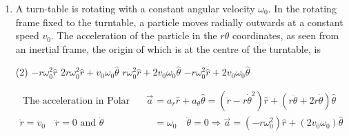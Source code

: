 \begin{enumerate}
 \begin{tasks}(4)
	\task[\textbf{a.}]$10 g$
	\task[\textbf{b.}] $50 \mathrm{~g}$
	\task[\textbf{c.}] $100 \mathrm{~g}$
	\task[\textbf{d.}]  $g$
\end{tasks}
\begin{answer}$\left. \right. $
	\begin{figure}[H]
		\centering
		\texttt{[image: Net-19-35]}
	\end{figure}
	\begin{align*}
	\text{From conservation}&\text{ at energy}\\
	m g h&=\frac{1}{2} m v^{2} \Rightarrow v=\sqrt{20 g}\\
	\text{The equation at }&\text{motion when partition the cushion}\\
	m v \frac{d v}{d x}&=m g-k \\
	\int_{\sqrt{20 g}}^{0} v d v&=\left.\int_{0.1}^{0}\left(g-\frac{k}{m}\right) d x \frac{v^{2}}{2}\right|_{\sqrt{20 g}} ^{0}=\left(g-\frac{k}{m}\right) \times 0.1 \\
	-\frac{20 g \times 0.1}{2}&=\left(g-\frac{k}{m}\right)=a-100 g=a
	\end{align*}
		So the correct answer is \textbf{Option (c)}
\end{answer}
\item  A turn-table is rotating with a constant angular velocity $\omega_{0}$. In the rotating frame fixed to the turntable, a particle moves radially outwards at a constant speed $v_{0}$. The acceleration of the particle in the $r \theta$ coordinates, as seen from an inertial frame, the origin of which is at the centre of the turntable, is
 \begin{tasks}(2)
	\task[\textbf{a.}]$-r \omega_{0}^{2} \hat{r}$
	\task[\textbf{b.}]$2 r \omega_{0}^{2} \hat{r}+v_{0} \omega_{0} \hat{\theta}$
	\task[\textbf{c.}]$r \omega_{0}^{2} \hat{r}+2 v_{0} \omega_{0} \hat{\theta}$
	\task[\textbf{d.}] $-r \omega_{0}^{2} \hat{r}+2 v_{0} \omega_{0} \hat{\theta}$
\end{tasks}
\begin{answer}
	\begin{align*}
	\text { The acceleration in Polar coordinate, } \vec{a}&=a_{r} \hat{r}+a_{\theta} \hat{\theta}=\left(\ddot{r}-r \dot{\theta}^{2}\right) \hat{r}+(r \ddot{\theta}+2 \dot{r} \dot{\theta}) \hat{\theta}\\
	\dot{r}=v_{0} \quad \ddot{r}=0 \text { and } \dot{\theta}&=\omega_{0} \quad \ddot{\theta}=0 \Rightarrow \vec{a}=\left(-r \omega_{0}^{2}\right) \hat{r}+\left(2 v_{0} \omega_{0}\right) \hat{\theta}

\end{align*}
\end{answer}
\end{enumerate}
